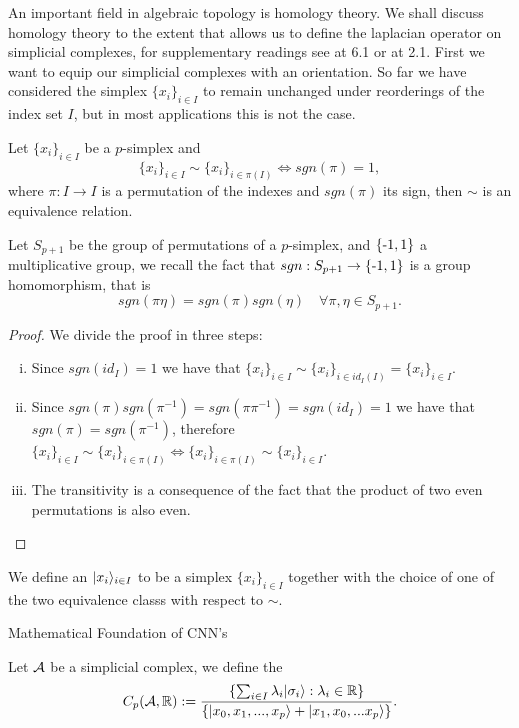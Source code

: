 \documentclass[../1.tex]{subfiles}
\begin{document}
    An important field in algebraic topology is homology theory. We shall discuss homology theory to the extent
    that allows us to define the laplacian operator on simplicial complexes, for supplementary readings see \cite{singerthorpe} at 6.1 or \cite{hatcher} at 2.1.
    First we want to equip our simplicial complexes with an orientation. So far we have considered the simplex $\{x_i\}_{i \in I}$ to remain
    unchanged under reorderings of the index set $I$, but in most applications this is not the case.

    \begin{prop}
        Let $\{x_i\}_{i \in I}$ be a $p$-simplex and
        \[ \{x_i\}_{i \in I} \sim \{x_i\}_{i \in \pi(I)} \iff sgn(\pi) = 1,\]
        where $\pi : I \to I$ is a permutation of the indexes and $sgn(\pi)$ its sign, then $\sim$
        is an equivalence relation.
    \end{prop}
    \begin{rem}
        Let $S_{p+1}$ be the group of permutations of a $p$-simplex, and $\{\text{-}1,1\}$ a multiplicative group,
        we recall the fact that $sgn: S_{p+1} \to \{\text{-}1,1\}$ is a group homomorphism, that is \[sgn(\pi\eta) = sgn(\pi)sgn(\eta) \quad \forall \pi,\eta \in S_{p+1}.\]
    \end{rem}
    \begin{proof}
        We divide the proof in three steps:
        \begin{enumerate}[(i)]
            \item Since $sgn(id_I) = 1$ we have that $\{x_i\}_{i \in I} \sim \{x_i\}_{i \in id_I(I)} = \{x_i\}_{i \in I} $.
            \item Since $sgn(\pi)sgn(\pi^{-1}) = sgn(\pi\pi^{-1})=sgn(id_I)=1$ we have that $sgn(\pi) = sgn(\pi^{-1})$, therefore
                  $ \{x_i\}_{i \in I} \sim \{x_i\}_{i \in \pi(I)} \iff \{x_i\}_{i \in \pi(I)} \sim \{x_i\}_{i \in I}$.
            \item The transitivity is a consequence of the fact that the product of two even permutations is also even.\qedhere
        \end{enumerate}
    \end{proof}
  
    \begin{defn}
        We define an  $| x_i \rangle_{i \in I}$ to be a simplex $\{x_i\}_{i \in I}$ together with the choice of
        one of the two equivalence classs with respect to $\sim$.
    \end{defn}
    Mathematical Foundation of CNN's
    \begin{defn}
        Let $\mathcal{A}$ be a simplicial complex, we define the  
        \[ C_p(\mathcal{A},\mathbb{R}) := \frac{\{ \sum_{i \in I} \lambda_i | \sigma_i \rangle : \lambda_i \in \mathbb{R} \}}{\{| x_0,x_1,...,x_p \rangle+| x_1,x_0,...x_p \rangle\} }.\]
    \end{defn}
\end{document}
